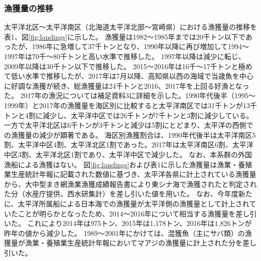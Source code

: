 \subsubsection{漁獲量の推移}
太平洋北区～太平洋南区（北海道太平洋北部～宮崎県）における漁獲量の推移を表1、図\ref{fig:landings}に示した。
漁獲量は1982～1985年までは20千トン以下であったが、1986年に急増して37千トンとなり、1990年以降に再び増加して1994～1997年は70千～80千トンと高い水準で推移した。
1997年以降は減少に転じ、2009年以降は30千トン以下で推移した。
2015～2016年は16千～17千トンと極めて低い水準で推移したが、2017年は7月以降、高知県以西の海域で当歳魚を中心に好調な漁獲が続き、総漁獲量は24千トンと2016、2017年を上回る好漁となった。
2017年の漁況については補足資料3に詳細を示した。1990年代後半（1995～1999年）と2017年の漁獲量を海区別に比較すると太平洋南区では31千トンが13千トンと4割に減少し、太平洋中区では26千トンが7千トンと3割に減少している。
一方で太平洋北区は6千トンが3千トンと減少は5割にとどまり、太平洋の西側での漁獲量の減少が顕著である。
海区別漁獲割合は、1990年代後半は太平洋南区5割、太平洋中区4割、太平洋北区1割であった。2017年は太平洋南区6割、太平洋中区3割、太平洋北区1割であり、太平洋中区で減少した。
なお、本系群の外国漁船による漁獲はない。
図\ref{fig:landings}および表1に示した漁獲量は漁業・養殖業生産統計年報に記載された数値に基づき、太平洋各県に計上されている漁獲量から、大中型まき網漁業漁獲成績報告書により東シナ海で漁獲されたと判定された分（水産庁提供、西水研集計）を差し引いた値を用いた。
なお、今年度新たに、太平洋所属船による日本海での漁獲量が太平洋側の漁獲量として計上されていたことが明らかとなったため、2014～2016年について相当する漁獲量を差し引いた。
これにより2014年は975トン、2015年は1,178トン、2016年は1,826トンが昨年の値から減少した。
1989～2001年にかけては、混獲魚（主にサバ類）の漁獲量が漁業・養殖業生産統計年報においてマアジの漁獲量に計上された分を差し引いた。
   